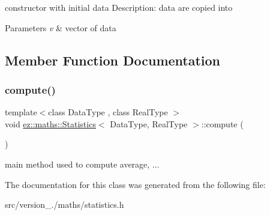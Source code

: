 constructor with initial data Description\+: data are copied into 
\begin{DoxyParams}{Parameters}
{\em v} & vector of data \\
\hline
\end{DoxyParams}


\subsection{Member Function Documentation}
\mbox{\label{classez_1_1maths_1_1Statistics_a3bdb44726f6e8948779f71cdfada0ee4}} 
\subsubsection{\texorpdfstring{compute()}{compute()}}
{\footnotesize\ttfamily template$<$class Data\+Type , class Real\+Type $>$ \\
void \hyperlink{classez_1_1maths_1_1Statistics}{ez\+::maths\+::\+Statistics}$<$ Data\+Type, Real\+Type $>$\+::compute (\begin{DoxyParamCaption}{ }\end{DoxyParamCaption})\hspace{0.3cm}{\ttfamily [inline]}}

main method used to compute average, ... 

The documentation for this class was generated from the following file\+:\begin{DoxyCompactItemize}
\item 
src/version\+\_./maths/statistics.\+h\end{DoxyCompactItemize}
